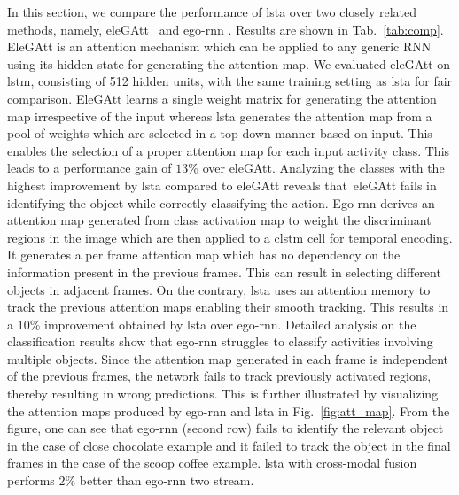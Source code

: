 \documentclass[10pt,twocolumn,letterpaper]{article}
\begin{document}
In this section, we compare the performance of \ac{lsta} over two closely related methods, namely, eleGAtt~\cite{attention_eccv18} and ego-rnn \cite{sudhakaran2018attention}. Results are shown in Tab.~\ref{tab:comp}. EleGAtt is an attention mechanism which can be applied to any generic RNN using its hidden state for generating the attention map. We evaluated eleGAtt on \ac{lstm}, consisting of 512 hidden units, with the same training setting as \ac{lsta} for fair comparison. EleGAtt learns a single weight matrix for generating the attention map irrespective of the input whereas \ac{lsta} generates the attention map from a pool of weights which are selected in a top-down manner based on input. This enables the selection of a proper attention map for each input activity class. This leads to a performance gain of $13\%$ over eleGAtt. Analyzing the classes with the highest improvement by \ac{lsta} compared to eleGAtt reveals that~eleGAtt fails in identifying the object while correctly classifying the action. Ego-rnn \cite{sudhakaran2018attention} derives an attention map generated from class activation map to weight the discriminant regions in the image which are then applied to a \ac{clstm} cell for temporal encoding. It generates a per frame attention map which has no dependency on the information present in the previous frames. This can result in selecting different objects in adjacent frames. On the contrary, \ac{lsta} uses an attention memory to track the previous attention maps enabling their smooth tracking. This results in a $10\%$ improvement obtained by \ac{lsta} over ego-rnn. Detailed analysis on the classification results show that ego-rnn struggles to classify activities involving multiple objects. Since the attention map generated in each frame is independent of the previous frames, the network fails to track previously activated regions, thereby resulting in wrong predictions. This is further illustrated by visualizing the attention maps produced by ego-rnn and \ac{lsta} in Fig.~\ref{fig:att_map}. From the figure, one can see that ego-rnn (second row) fails to identify the relevant object in the case of close chocolate example and it failed to track the object in the final frames in the case of the scoop coffee example. \ac{lsta} with cross-modal fusion performs $2\%$ better than  ego-rnn two stream. 
\end{document}
